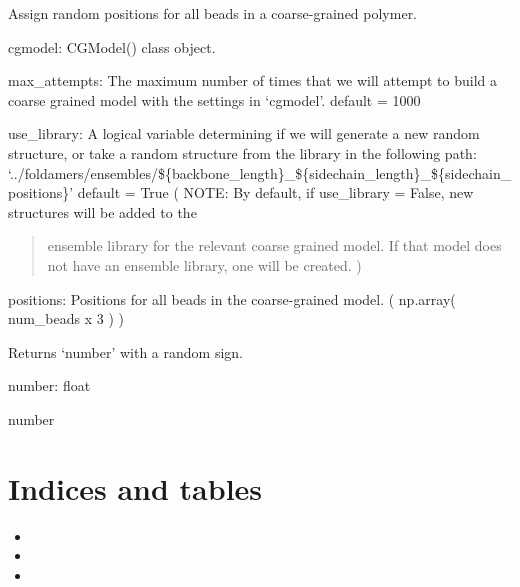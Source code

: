 \documentclass[letterpaper,12pt,english,openany,oneside]{sphinxmanual}
\begin{document}

\begin{fulllineitems}
\label{\detokenize{utilities:utilities.util.random_positions}}
Assign random positions for all beads in a coarse-grained polymer.

cgmodel: CGModel() class object.

max\_attempts: The maximum number of times that we will attempt to build
a coarse grained model with the settings in ‘cgmodel’.
default = 1000

use\_library: A logical variable determining if we will generate a new
random structure, or take a random structure from the library in the following path:
‘../foldamers/ensembles/\$\{backbone\_length\}\_\$\{sidechain\_length\}\_\$\{sidechain\_positions\}’
default = True
( NOTE: By default, if use\_library = False, new structures will be added to the
\begin{quote}

ensemble library for the relevant coarse grained model.  If that model does not
have an ensemble library, one will be created. )
\end{quote}

positions: Positions for all beads in the coarse-grained model.
( np.array( num\_beads x 3 ) )

\end{fulllineitems}


\begin{fulllineitems}
\label{\detokenize{utilities:utilities.util.random_sign}}
Returns ‘number’ with a random sign.

number: float

number

\end{fulllineitems}



\chapter{Indices and tables}
\label{\detokenize{index:indices-and-tables}}\begin{itemize}
\item {} 

\item {} 

\item {} 

\end{itemize}
\end{document}
